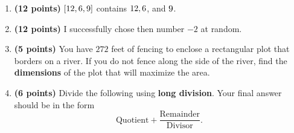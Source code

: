\documentclass[12pt]{amsart}
\begin{document}
\begin{enumerate}
\item {\bf (12 points)} 
 $\setthreetwo$ contains $\athreetwo,\bthreetwo$, and $\cthreetwo$. 
\vfill 
\def \a{7}\def \atwoone{1}\def \atwotwo{-2}\def \atwothree{1}\def \btwothree{6}\def \sumtwothree{7}\def \diftwothree{-5}\def \bigtwothree{100}\def \powtwothree{6}\def \logtwothree{0.0}\def \factortwothree{65}\def \atwofour{1.85}\def \btwofour{1.564}\def \tooshorttwofour{10.1}\def \moneytwofour{10.10}\def \longertwofour{10.10000}\def \atwofive{0.12}\def \btwofive{0.12346}\def \athreeone{5}\def \bthreeone{3}\def \setthreetwo{[12, 6, 9]}\def \athreetwo{12}\def \bthreetwo{6}\def \cthreetwo{9}\def \controlthreethree{-5}\def \athreethree{2}\def \topthreethree{0}\def \athreefour{5}\def \bthreefour{3}\def \listthreefour{[1, 2, 3, 4]}\def \afourone{12}\def \bfourone{-8}\def \fracfourone{\frac{-3}{2}}\def \rootfourtwo{8}\def \simplifiedfourtwo{2 \sqrt{2}}\def \sqrtlistfourtwo{[2, 2]}\def \outfourtwo{2}\def \infourtwo{2}\def \wowfourtwo{1}\def \afourthree{0}\def \nicethreefour{3x^{2}-x^{}}\def \nastythreefour{xyz^{3}}\def \cfourthree{-4}\def \dfourthree{9}\def \infourthree{-4x^{}}\def \outfourthree{+9y^{}}\def \afourfour{1235836}\def \nicefourfour{1,235,836}\def \goodfourfour{1,000,000.12345}\def \badfourfour{1,000,000.1}
\item {\bf (12 points)} 
 I successfully chose then number $\atwotwo$ at random. 
\vfill 
\newpage\def \x{68}\def \y{136}\def \L{272}\def \area{9248}
\item {\bf (5 points)} 
 You have $\L$ feet of fencing to enclose a rectangular plot that borders on a river. If you do not fence along the side of the river, find the \textbf{dimensions} of the plot that will maximize the area. \\

  
\vfill \vfill \vfill
\def \a{6}\def \b{4}\def \c{-7}\def \r{11}\def \monicpol{x^{}+6}\def \longnbad{4x^{2}+17x^{}-31}\def \anspol{4x^{}-7}
\item {\bf (6 points)} 
 Divide the following using {\bf long division}. Your final answer should be in the form $$ \text{Quotient} + \dfrac{\text{Remainder}}{\text{Divisor}}.$$

\vspace{3mm}


\end{enumerate}
\end{document}
